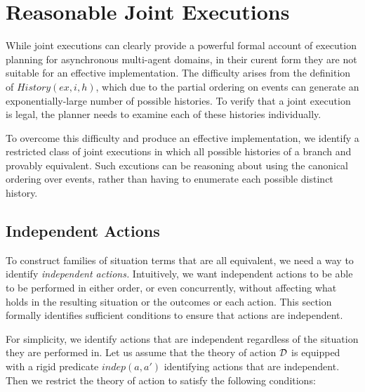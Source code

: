 \section{Reasonable Joint Executions}

While joint executions can clearly provide a powerful formal account
of execution planning for asynchronous multi-agent domains, in their
curent form they are not suitable for an effective implementation.
The difficulty arises from the definition of $History(ex,i,h)$, which
due to the partial ordering on events can generate an exponentially-large
number of possible histories. To verify that a joint execution is
legal, the planner needs to examine each of these histories individually.

To overcome this difficulty and produce an effective implementation,
we identify a restricted class of joint executions in which all possible
histories of a branch and provably equivalent. Such excutions can
be reasoning about using the canonical ordering over events, rather
than having to enumerate each possible distinct history.


\subsection{Independent Actions\label{sec:JointExec:IndepActs}}

To construct families of situation terms that are all equivalent,
we need a way to identify \emph{independent actions.} Intuitively,
we want independent actions to be able to be performed in either order,
or even concurrently, without affecting what holds in the resulting
situation or the outcomes or each action. This section formally identifies
sufficient conditions to ensure that actions are independent.

For simplicity, we identify actions that are independent regardless
of the situation they are performed in. Let us assume that the theory
of action $\mathcal{D}$ is equipped with a rigid predicate $indep(a,a')$
identifying actions that are independent. Then we restrict the theory
of action to satisfy the following conditions:

